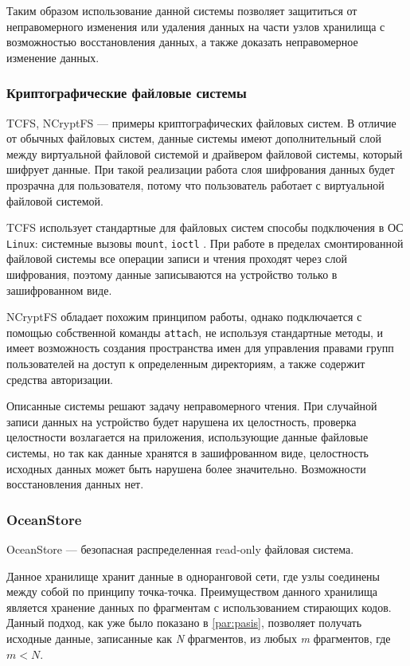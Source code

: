 Таким образом использование данной системы позволяет защититься от неправомерного изменения или удаления данных на части узлов хранилища с возможностью восстановления данных, а также доказать неправомерное изменение данных.

\subsubsection{Криптографические файловые системы}

TCFS\cite{tcfs}, NCryptFS\cite{ncryptfs} --- примеры криптографических файловых систем. В отличие от обычных файловых систем, данные системы имеют дополнительный слой между виртуальной файловой системой и драйвером файловой системы, который шифрует данные. При такой реализации работа слоя шифрования данных будет прозрачна для пользователя, потому что пользователь работает с виртуальной файловой системой.

TCFS использует стандартные для файловых систем способы подключения в ОС \texttt{Linux}: системные вызовы \texttt{mount}, \texttt{ioctl} \cite{linux}. При работе в пределах смонтированной файловой системы все операции записи и чтения проходят через слой шифрования, поэтому данные записываются на устройство только в зашифрованном виде.

NCryptFS обладает похожим принципом работы, однако подключается с помощью собственной команды \texttt{attach}, не используя стандартные методы, и имеет возможность создания пространства имен для управления правами групп пользователей на доступ к определенным директориям, а также содержит средства авторизации.

Описанные системы решают задачу неправомерного чтения. При случайной записи данных на устройство будет нарушена их целостность, проверка целостности возлагается на приложения, использующие данные файловые системы, но так как данные хранятся в зашифрованном виде, целостность исходных данных может быть нарушена более значительно. Возможности восстановления данных нет.

\subsubsection{OceanStore}
\label{par:ocean}

OceanStore \cite{ocean} --- безопасная распределенная read-only файловая система.

Данное хранилище хранит данные в одноранговой сети, где узлы соединены между собой по принципу точка-точка. Преимуществом данного хранилища является хранение данных по фрагментам с использованием стирающих кодов. Данный подход, как уже было показано в \ref{par:pasis}, позволяет получать исходные данные, записанные как \textit{N} фрагментов, из любых \textit{m} фрагментов, где $m < N$.

